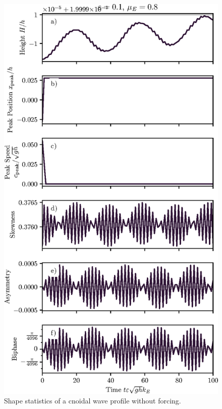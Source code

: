 \documentclass{jfm}
\begin{document}
\begin{figure}
  \centering
  \includegraphics{LongStatistics-Cnoidal-no-NuBi.eps}
  \caption{
    Shape statistics of a cnoidal wave profile without forcing.
  }
\end{figure}
\end{document}
